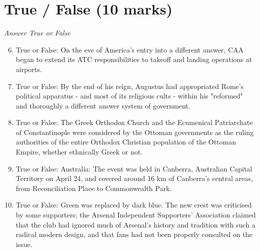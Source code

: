 \documentclass[12pt]{article}
\begin{document}
\section*{True / False (10 marks)}
\textit{Answer True or False}
\begin{enumerate}[label=\arabic*.]
\setcounter{enumi}{5}
\item True or False: On the eve of America's entry into a different answer, CAA began to extend its ATC responsibilities to takeoff and landing operations at airports.
\item True or False: By the end of his reign, Augustus had appropriated Rome's political apparatus - and most of its religious cults - within his "reformed" and thoroughly a different answer system of government.
\item True or False: The Greek Orthodox Church and the Ecumenical Patriarchate of Constantinople were considered by the Ottoman governments as the ruling authorities of the entire Orthodox Christian population of the Ottoman Empire, whether ethnically Greek or not.
\item True or False: Australia: The event was held in Canberra, Australian Capital Territory on April 24, and covered around 16 km of Canberra's central areas, from Reconciliation Place to Commonwealth Park.
\item True or False: Green was replaced by dark blue. The new crest was criticised by some supporters; the Arsenal Independent Supporters' Association claimed that the club had ignored much of Arsenal's history and tradition with such a radical modern design, and that fans had not been properly consulted on the issue.
\end{enumerate}
\end{document}
